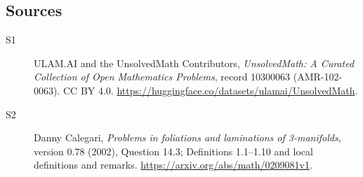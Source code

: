 \documentclass[11pt]{article}
\begin{document}
\subsection{Sources}
\begin{description}
\item[\hypertarget{source:10300063:1}{S1}] ULAM.AI and the UnsolvedMath Contributors, \emph{UnsolvedMath: A Curated Collection of Open Mathematics Problems}, record 10300063 (AMR-102-0063). CC BY 4.0. \url{https://huggingface.co/datasets/ulamai/UnsolvedMath}.
\item[\hypertarget{source:10300063:2}{S2}] Danny Calegari, \emph{Problems in foliations and laminations of 3-manifolds}, version 0.78 (2002), Question 14.3; Definitions 1.1--1.10 and local definitions and remarks. \url{https://arxiv.org/abs/math/0209081v1}.
\end{description}
\label{end:10300063}
\end{document}

